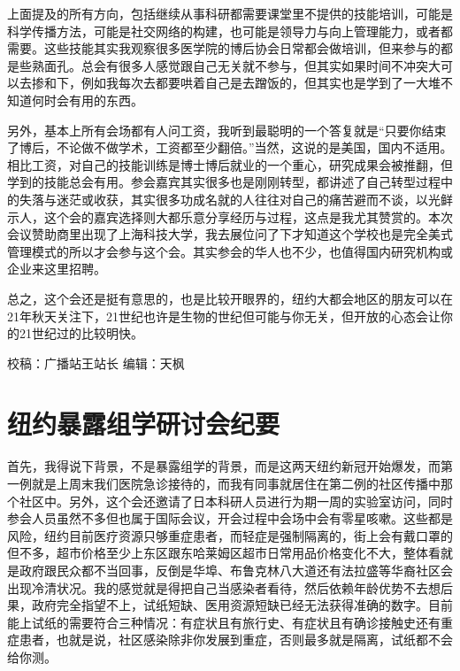 \documentclass[]{book}
\begin{document}
上面提及的所有方向，包括继续从事科研都需要课堂里不提供的技能培训，可能是科学传播方法，可能是社交网络的构建，也可能是领导力与向上管理能力，或者都需要。这些技能其实我观察很多医学院的博后协会日常都会做培训，但来参与的都是些熟面孔。总会有很多人感觉跟自己无关就不参与，但其实如果时间不冲突大可以去掺和下，例如我每次去都要哄着自己是去蹭饭的，但其实也是学到了一大堆不知道何时会有用的东西。

另外，基本上所有会场都有人问工资，我听到最聪明的一个答复就是``只要你结束了博后，不论做不做学术，工资都至少翻倍。''当然，这说的是美国，国内不适用。相比工资，对自己的技能训练是博士博后就业的一个重心，研究成果会被推翻，但学到的技能总会有用。参会嘉宾其实很多也是刚刚转型，都讲述了自己转型过程中的失落与迷茫或收获，其实很多功成名就的人往往对自己的痛苦避而不谈，以光鲜示人，这个会的嘉宾选择则大都乐意分享经历与过程，这点是我尤其赞赏的。本次会议赞助商里出现了上海科技大学，我去展位问了下才知道这个学校也是完全美式管理模式的所以才会参与这个会。其实参会的华人也不少，也值得国内研究机构或企业来这里招聘。

总之，这个会还是挺有意思的，也是比较开眼界的，纽约大都会地区的朋友可以在21年秋天关注下，21世纪也许是生物的世纪但可能与你无关，但开放的心态会让你的21世纪过的比较明快。

校稿：广播站王站长
编辑：天枫

\hypertarget{ux7ebdux7ea6ux66b4ux9732ux7ec4ux5b66ux7814ux8ba8ux4f1aux7eaaux8981}{%
\section{纽约暴露组学研讨会纪要}\label{ux7ebdux7ea6ux66b4ux9732ux7ec4ux5b66ux7814ux8ba8ux4f1aux7eaaux8981}}

首先，我得说下背景，不是暴露组学的背景，而是这两天纽约新冠开始爆发，而第一例就是上周末我们医院急诊接待的，而我有同事就居住在第二例的社区传播中那个社区中。另外，这个会还邀请了日本科研人员进行为期一周的实验室访问，同时参会人员虽然不多但也属于国际会议，开会过程中会场中会有零星咳嗽。这些都是风险，纽约目前医疗资源只够重症患者，而轻症是强制隔离的，街上会有戴口罩的但不多，超市价格至少上东区跟东哈莱姆区超市日常用品价格变化不大，整体看就是政府跟民众都不当回事，反倒是华埠、布鲁克林八大道还有法拉盛等华裔社区会出现冷清状况。我的感觉就是得把自己当感染者看待，然后依赖年龄优势不去想后果，政府完全指望不上，试纸短缺、医用资源短缺已经无法获得准确的数字。目前能上试纸的需要符合三种情况：有症状且有旅行史、有症状且有确诊接触史还有重症患者，也就是说，社区感染除非你发展到重症，否则最多就是隔离，试纸都不会给你测。
\end{document}

